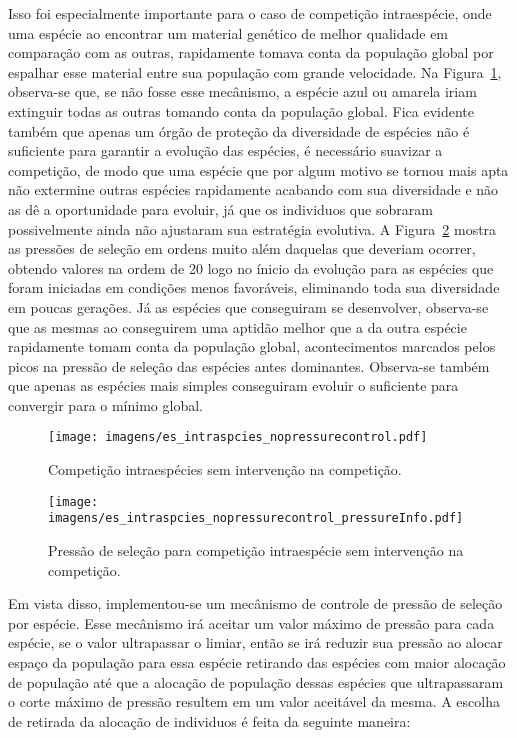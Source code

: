 Isso foi especialmente importante para o caso de competição
intraespécie, onde uma espécie ao encontrar um material genético de
melhor qualidade em comparação com as outras, rapidamente tomava conta
da população global por espalhar esse material entre sua população com
grande velocidade. Na Figura~\ref{fig:intraspecies_nopressure},
observa-se que, se não fosse esse mecânismo, a espécie azul ou amarela
iriam extinguir todas as outras tomando conta da população
global. Fica evidente também que apenas um órgão de proteção da
diversidade de espécies não é suficiente para garantir a evolução das
espécies, é necessário suavizar a competição, de modo que uma espécie
que por algum motivo se tornou mais apta não extermine outras espécies
rapidamente acabando com sua diversidade e não as dê a oportunidade
para evoluir, já que os individuos que sobraram possivelmente ainda não
ajustaram sua estratégia evolutiva. A 
Figura~\ref{fig:intraspecies_nopressurecontrol_info} mostra as
pressões de seleção em ordens muito além daquelas que deveriam
ocorrer, obtendo valores na ordem de 20 logo no ínicio da evolução
para as espécies que foram iniciadas em condições menos favoráveis,
eliminando toda sua diversidade em poucas gerações. Já as espécies que
conseguiram se desenvolver, observa-se que as mesmas ao conseguirem
uma aptidão melhor que a da outra espécie rapidamente tomam conta da
população global, acontecimentos marcados pelos picos na pressão de
seleção das espécies antes dominantes. Observa-se também que apenas as
espécies mais simples conseguiram evoluir o suficiente para convergir
para o mínimo global.

\begin{figure}[h!t]
\centering
\texttt{[image: imagens/es\_intraspcies\_nopressurecontrol.pdf]}
\caption[Competição intraespécies sem intervenção na
competição.]{Competição intraespécies sem intervenção na competição.}
\label{fig:intraspecies_nopressure}
\end{figure}

\begin{figure}[h!t]
\centering
\texttt{[image: imagens/es\_intraspcies\_nopressurecontrol\_pressureInfo.pdf]}
\caption[Pressão de seleção para competição intraespécie sem
intervenção na competição.]{Pressão de seleção para competição
intraespécie sem intervenção na competição.}
\label{fig:intraspecies_nopressurecontrol_info}
\end{figure}

Em vista disso, implementou-se um mecânismo de controle de pressão de
seleção por espécie. Esse mecânismo irá aceitar um valor máximo de
pressão para cada espécie, se o valor ultrapassar o limiar, então se irá
reduzir sua pressão ao alocar espaço da população para essa espécie
retirando das espécies com maior alocação de população até que a
alocação de população dessas espécies que ultrapassaram o corte máximo
de pressão resultem em um valor aceitável da mesma. A escolha de
retirada da alocação de individuos é feita da seguinte maneira:

